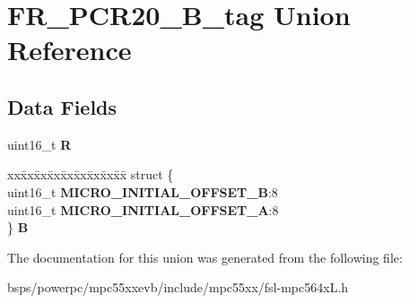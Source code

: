 \hypertarget{unionFR__PCR20__16B__tag}{}\section{F\+R\+\_\+\+P\+C\+R20\+\_\+B\+\_\+tag Union Reference}
\label{unionFR__PCR20__16B__tag}
\subsection*{Data Fields}
\begin{DoxyCompactItemize}
\item 
\mbox{\label{unionFR__PCR20__16B__tag_a800cd47bdc5d6341afdc31f828208640}} 
uint16\+\_\+t {\bfseries R}
\item 
\mbox{\label{unionFR__PCR20__16B__tag_a7427faebe6a953281a9d5e2be2638947}} 
\begin{tabbing}
xx\=xx\=xx\=xx\=xx\=xx\=xx\=xx\=xx\=\kill
struct \{\\
\>uint16\_t {\bfseries MICRO\_INITIAL\_OFFSET\_B}:8\\
\>uint16\_t {\bfseries MICRO\_INITIAL\_OFFSET\_A}:8\\
\} {\bfseries B}\\

\end{tabbing}\end{DoxyCompactItemize}


The documentation for this union was generated from the following file\+:\begin{DoxyCompactItemize}
\item 
bsps/powerpc/mpc55xxevb/include/mpc55xx/fsl-\/mpc564x\+L.\+h\end{DoxyCompactItemize}
